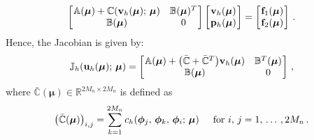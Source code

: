\documentclass[12pt, a4paper, twoside, openright]{report}
\numberwithin{equation}{chapter}
\theoremstyle{theorem}
\theoremstyle{definition}
\theoremstyle{remark}
\theoremstyle{proposition}
\numberwithin{figure}{chapter}
\newcommand{\bg}[1]{\boldsymbol{#1}}
\begin{document}
		\begin{equation}
			\label{eq:ns-system}
			\begin{bmatrix}
			\hspace*{-0.15cm}
			\begin{array}{cc}
				\mathbb{A}(\bg{\mu}) + \mathbb{C}(\mathbf{v}_h(\bg{\mu}); \, \bg{\mu}) & \mathbb{B}(\bg{\mu})^T \\
				\mathbb{B}(\bg{\mu}) & 0
			\end{array} 
			\hspace*{-0.15cm}
			\end{bmatrix} 
			\begin{bmatrix}
			\hspace*{-0.15cm}
			\begin{array}{c}
				\mathbf{v}_h(\bg{\mu}) \\
				\mathbf{p}_h(\bg{\mu})
			\end{array} 
			\hspace*{-0.15cm}
			\end{bmatrix} 
			=
			\begin{bmatrix}
			\hspace*{-0.15cm}
			\begin{array}{c}
				\mathbf{f}_1(\bg{\mu}) \\
				\mathbf{f}_2(\bg{\mu})
			\end{array} 
			\hspace*{-0.15cm}
			\end{bmatrix} \, .
		\end{equation}
		Hence, the Jacobian is given by:
		\begin{equation}
			\label{eq:ns-jacobian}
			\mathbb{J}_h(\mathbf{u}_h(\bg{\mu}); \, \bg{\mu}) =
			\begin{bmatrix}
			\hspace*{-0.15cm}
			\begin{array}{cc} 
				\mathbb{A}(\bg{\mu}) + \big( \bar{\mathbb{C}} + \bar{\mathbb{C}}^T \big) \mathbf{v}_h(\bg{\mu}) & \mathbb{B}^T(\bg{\mu}) \\
				\mathbb{B}(\bg{\mu}) & 0
			\end{array} 
			\hspace*{-0.15cm}
			\end{bmatrix} \, ,
		\end{equation}
		where $\bar{\mathbb{C}}(\bg{\mu}) \in \mathbb{R}^{2 M_n \times 2 M_n}$ is defined as
		\begin{equation*}
			\big( \bar{\mathbb{C}}(\bg{\mu}) \big)_{i,j} = \sum_{k = 1}^{2 M_n} c_h(\bg{\phi}_j, \, \bg{\phi}_k, \, \bg{\phi}_i; \, \bg{\mu}) \hspace*{0.5cm} \text{for $i, \, j = 1, \, \ldots \, , 2 M_n$} \, .
		\end{equation*}
		
\end{document}
